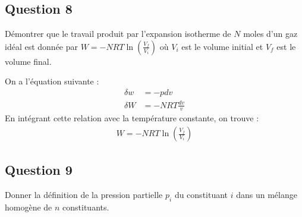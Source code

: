 \subsection*{Question 8}
Démontrer que le travail produit par l'expansion isotherme de $N$ moles d'un gaz idéal est donnée par 
$W = -NRT\ln \left(\frac{V_f}{V_i}\right)$ où $V_i$ est le volume initial et $V_f$ est le volume final.
\begin{tcolorbox}
    On a l'équation suivante : 
    \begin{align*}
        \delta w &= -pdv\\
        \delta W &= -NRT \frac{dv}{v}
    \end{align*}
    En intégrant cette relation avec la température constante, on trouve : 
    \begin{align*}
        W = -NRT\ln \left(\frac{V_f}{V_i}\right)
    \end{align*}
\end{tcolorbox}

\subsection*{Question 9}
Donner la définition de la pression partielle $p_i$ du constituant $i$ dans un mélange homogène de $n$ constituants.\\

